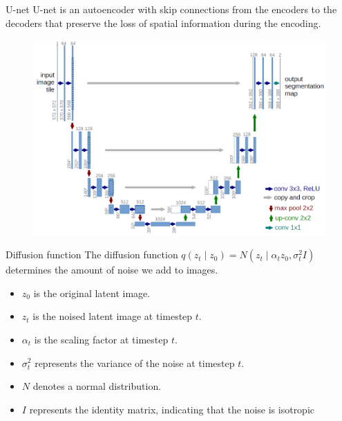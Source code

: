 \documentclass[8pt]{beamer}
\begin{document}
\begin{frame}{U-net}
    U-net is an autoencoder with skip connections from the encoders to the decoders that preserve the loss of spatial information during the encoding.
   \begin{figure}
       \centering
       \includegraphics[scale=0.10]{images/u-net-architecture}
       \label{fig:NN_training}
   \end{figure}
   \cite{uni_unet}
\end{frame}



\begin{frame}{Diffusion function}
    The diffusion function $q(z_t \mid z_0) = N(z_t \mid \alpha_t z_0, \sigma_t^2I)$ determines the amount of noise we add to images.
    \begin{itemize}
        \item $z_0$ is the original latent image.
        \item $z_t$ is the noised latent image at timestep $t$.
        \item $\alpha_t$ is the scaling factor at timestep $t$.
        \item $\sigma^2_t$ represents the variance of the noise at timestep $t$.
        \item $N$ denotes a normal distribution.
        \item $I$ represents the identity matrix, indicating that the noise is isotropic
    \end{itemize}
\end{frame}
\end{document}
